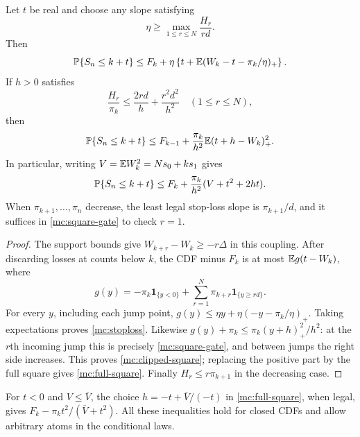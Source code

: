 \begin{lemma}\label{mc:staircase}
Let $t$ be real and choose any slope satisfying
\[
 \eta\ge\max_{1\le r\le N}\frac{H_r}{rd}.
\]
Then
\begin{equation}\label{mc:stoploss}
 \mathbb P\{S_n\le k+t\}
 \le F_k+\eta\left\{t+\mathbb E(W_k-t-\pi_k/\eta)_+\right\}.
\end{equation}
If $h>0$ satisfies
\begin{equation}\label{mc:square-gate}
 \frac{H_r}{\pi_k}\le\frac{2rd}{h}+\frac{r^2d^2}{h^2}
 \quad(1\le r\le N),
\end{equation}
then
\begin{equation}\label{mc:clipped-square}
 \mathbb P\{S_n\le k+t\}
 \le F_{k-1}+\frac{\pi_k}{h^2}\mathbb E(t+h-W_k)_+^2.
\end{equation}
In particular, writing $V=\mathbb E W_k^2=Ns_0+ks_1$ gives
\begin{equation}\label{mc:full-square}
 \mathbb P\{S_n\le k+t\}
 \le F_k+\frac{\pi_k}{h^2}(V+t^2+2ht).
\end{equation}
When $\pi_{k+1},\ldots,\pi_n$ decrease, the least legal stop-loss
slope is $\pi_{k+1}/d$, and it suffices in
\eqref{mc:square-gate} to check $r=1$.
\end{lemma}
\begin{proof}
The support bounds give $W_{k+r}-W_k\ge-r\Delta$ in this coupling.
After discarding losses at counts below $k$, the CDF minus $F_k$
is at most $\mathbb E g(t-W_k)$, where
\[
 g(y)=-\pi_k\mathbf1_{\{y<0\}}
       +\sum_{r=1}^N\pi_{k+r}\mathbf1_{\{y\ge rd\}}.
\]
For every $y$, including each jump point,
$g(y)\le\eta y+\eta(-y-\pi_k/\eta)_+$.
Taking expectations proves \eqref{mc:stoploss}.
Likewise $g(y)+\pi_k\le\pi_k(y+h)_+^2/h^2$:
at the $r$th incoming jump this is precisely
\eqref{mc:square-gate}, and between jumps the right side increases.
This proves \eqref{mc:clipped-square}; replacing the positive part
by the full square gives \eqref{mc:full-square}.
Finally $H_r\le r\pi_{k+1}$ in the decreasing case.
\end{proof}

For $t<0$ and $V\le\overline V$, the choice
$h=-t+\overline V/(-t)$ in \eqref{mc:full-square}, when legal,
gives $F_k-\pi_k t^2/(\overline V+t^2)$. All these inequalities
hold for closed CDFs and allow arbitrary atoms in the conditional laws.

